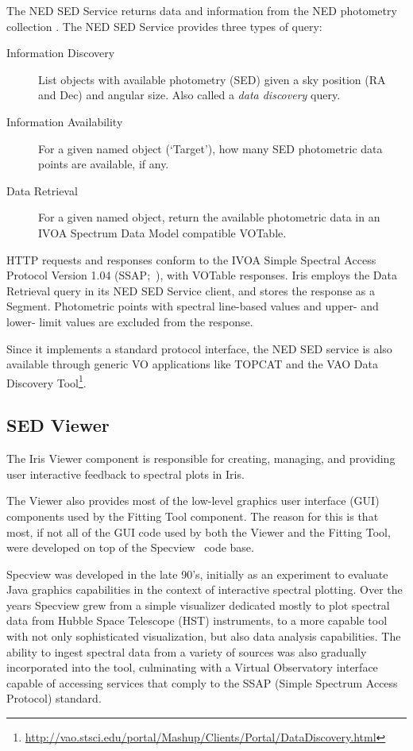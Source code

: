 \documentclass[final,5p]{elsarticle}
\begin{document}
The NED SED Service returns data and information from the NED photometry collection \citep{2007ASPC..376..153M}. The NED SED Service provides three types of query:
\begin{description}
 \item[Information Discovery] List objects with available photometry (SED) given a sky position (RA and Dec) and angular size.  Also called a \emph{data discovery} query.
 \item[Information Availability] For a given named object (`Target'), how many SED photometric data points are available, if any.
 \item[Data Retrieval] For a given named object, return the available photometric data in an IVOA Spectrum Data Model compatible VOTable.
\end{description}

HTTP requests and responses conform to the IVOA Simple Spectral Access Protocol Version 1.04 (SSAP;~\citep{2012arXiv1203.5725T}), with VOTable responses. Iris employs the Data Retrieval query in its NED SED Service client, and stores the response as a Segment. Photometric points with spectral line-based values and upper- and lower- limit values are excluded from the response.

Since it implements a standard protocol interface, the NED SED service is also available through generic VO applications like TOPCAT and the VAO Data Discovery Tool\footnote{\url{http://vao.stsci.edu/portal/Mashup/Clients/Portal/DataDiscovery.html}}.

\subsection{SED Viewer}
\label{subsec:specview}
The Iris Viewer component is responsible for creating, managing, and providing user interactive feedback to spectral plots in Iris.

The Viewer also provides most of the low-level graphics user interface (GUI) components used by the Fitting Tool component. The reason for this is that most, if not all of the GUI code used by both the Viewer and the Fitting Tool, were developed on top of the Specview~\citep{2002ASPC..281..120B} code base.

Specview was developed in the late 90's, initially as an experiment to evaluate Java graphics capabilities in the context of interactive spectral plotting. Over the years Specview grew from a simple visualizer dedicated mostly to plot spectral data from Hubble Space Telescope (HST) instruments, to a more capable tool with not only sophisticated visualization, but also data analysis capabilities. The ability to ingest spectral data from a variety of sources was also gradually incorporated into the tool, culminating with a Virtual Observatory interface capable of accessing services that comply to the SSAP (Simple Spectrum Access Protocol) standard.
\end{document}
